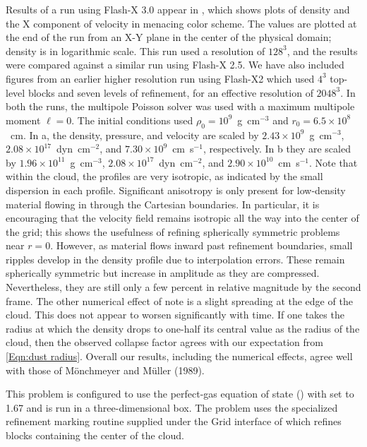 Results of a  run using Flash-X 3.0 appear in
, which shows plots of density and the X
component of velocity in menacing color scheme. The values are plotted
at the end of the run from an X-Y plane in the center of the physical
domain; density is in logarithmic scale. This run used a resolution of
$128^3$, and the results were compared against a similar run using
Flash-X 2.5.  We have also included figures from an earlier higher
resolution run using Flash-X2 which used $4^3$ top-level blocks and
seven levels of refinement, for an effective resolution of $2048^3$.
In both the runs, the multipole Poisson solver was used with a maximum
multipole moment $\ell=0$. The initial conditions used $\rho_0 =
10^9$~g~cm$^{-3}$ and $r_0 = 6.5\times10^8$~cm. In a, the density, pressure, and velocity are scaled by
$2.43\times10^9$~g~cm$^{-3}$, $2.08\times10^{17}$~dyn~cm$^{-2}$, and
$7.30\times10^9$~cm~s$^{-1}$, respectively. In b they are scaled by $1.96\times10^{11}$~g~cm$^{-3}$,
$2.08\times10^{17}$~dyn~cm$^{-2}$, and
$2.90\times10^{10}$~cm~s$^{-1}$. Note that within the cloud, the
profiles are very isotropic, as indicated by the small dispersion in
each profile. Significant anisotropy is only present for low-density
material flowing in through the Cartesian boundaries. In particular,
it is encouraging that the velocity field remains isotropic all the
way into the center of the grid; this shows the usefulness of
refining spherically symmetric problems near $r=0$. However, as
material flows inward past refinement boundaries, small ripples
develop in the density profile due to interpolation errors. These
remain spherically symmetric but increase in amplitude as they are
compressed. Nevertheless, they are still only a few percent in
relative magnitude by the second frame.  The other numerical effect
of note is a slight spreading at the edge of the cloud.  This does
not appear to worsen significantly with time. If one takes the
radius at which the density drops to one-half its central value as
the radius of the cloud, then the observed collapse factor agrees
with our expectation from \eqref{Eqn:dust radius}. Overall our
results, including the numerical effects, agree well with those of
M\"onchmeyer and M\"uller (1989).

This problem is configured to use the perfect-gas
equation of state () with  set to 1.67 and
is run in a three-dimensional box.  The problem uses the specialized
refinement marking routine supplied under the Grid interface of
 which refines blocks
containing the center of the cloud.

